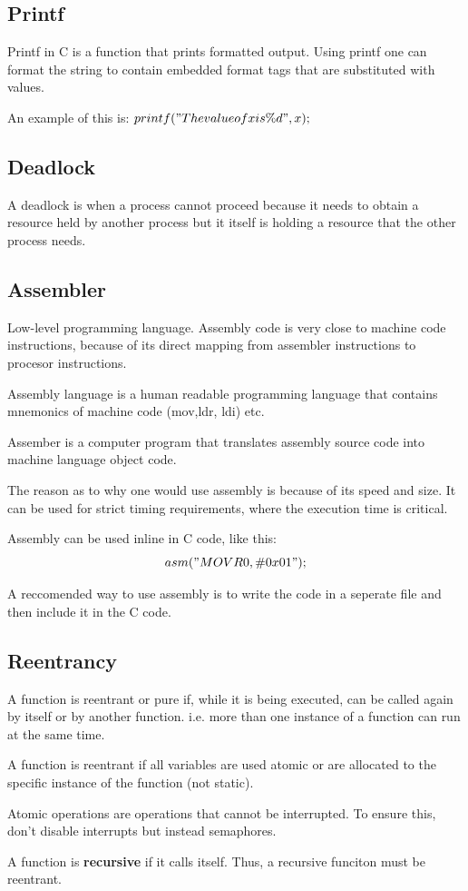 \subsection{Printf}

Printf in C is a function that prints formatted output.
Using printf one can format the string to contain embedded format tags
that are substituted with values.

An example of this is:
$printf("The value of x is \%d", x);$

\subsection{Deadlock}

A deadlock is when a process cannot proceed because
it needs to obtain a resource held by another process but
it itself is holding a resource that the other process needs.


\subsection{Assembler}
Low-level programming language.
Assembly code is very close to machine code instructions,
because of its direct mapping from assembler instructions
to procesor instructions.

Assembly language is a human readable programming language that
contains mnemonics of machine code (mov,ldr, ldi) etc.

Assember is a computer program that translates assembly source code
into machine language object code.

The reason as to why one would use assembly is because of its speed and size.
It can be used for strict timing requirements, where the execution time
is critical.


Assembly can be used inline in C code, like this:
$$ asm("MOV R0, \#0x01"); $$

A reccomended way to use assembly is to write the code in a seperate
file and then include it in the C code.



\subsection{Reentrancy}

A function is reentrant or pure if, while it is being executed,
can be called again by itself or by another function.
i.e. more than one instance of a function can run at the same time.

A function is reentrant if all variables are used atomic
or are allocated to the specific instance of the function (not static).

Atomic operations are operations that cannot be interrupted.
To ensure this, don't disable interrupts but
instead semaphores.


A function is \textbf{recursive} if it calls itself.
Thus, a recursive funciton must be reentrant.
